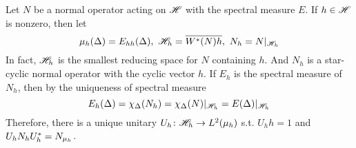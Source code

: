 \documentclass[a4paper,11pt]{report}
\begin{document}
Let $N$ be a normal operator acting on $\mathscr{H}$ with the spectral measure $E$. If $h \in \mathscr{H}$ is nonzero, then let 
\begin{equation*}
	\mu_h(\Delta) = E_{hh}(\Delta),~\mathscr{H}_h=\overline{W^{*}(N)h},~N_h = N|_{\mathscr{H}_h}
\end{equation*}
In fact, $\mathscr{H}_h$ is the smallest reducing space for $N$ containing $h$. And $N_h$ is a star-cyclic normal operator with the cyclic vector $h$. If $E_h$ is the spectral measure of $N_h$, then by the uniqueness of spectral measure
\begin{equation*}
	E_h(\Delta) = \chi_{\Delta}(N_h) = \chi_{\Delta}(N)|_{\mathscr{H}_h} = E(\Delta)|_{\mathscr{H}_h}
\end{equation*}
Therefore, there is a unique unitary $U_h \colon \mathscr{H}_h \rightarrow L^{2}(\mu_h)$ s.t. $U_hh=1$ and $U_h N_h U_h^{*} = N_{\mu_h}$.
\end{document}
